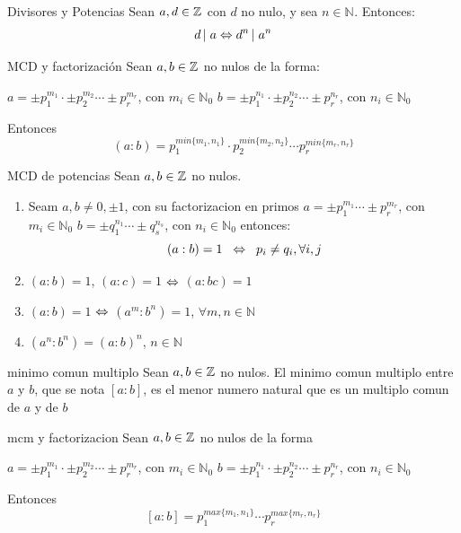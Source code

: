 \documentclass[10pt]{article}
\newcommand{\nat}[1]{\mathbb{N}^{#1}}
\begin{document}
\begin{propo}{Divisores y Potencias}
 Sean $a,d \in \entero{}$ con $d$ no nulo, y sea $n \in \nat{}$. Entonces:
 \[\divi{d}{a} \sii \divi{d^n}{a^n}\]
\end{propo}

\begin{propo}{MCD y factorización}
Sean $a, b \in \entero{}$ no nulos de la forma:
\begin{center}
 $a = \pm p_1^{m_1} \cdot \pm p_2^{m_2} \cdots \pm p_r^{m_r}$, con $m_i \in \nat{}_0$
 $b = \pm p_1^{n_1} \cdot \pm p_2^{n_2} \cdots \pm p_r^{n_r}$, con $n_i \in \nat{}_0$
 \end{center}
  Entonces
  \[(a:b) = p_1^{min\{m_1, n_1\}} \cdot p_2^{min\{m_2, n_2\}} \cdots  p_r^{min\{m_r, n_r\}}\]
\end{propo}

\begin{cor}{MCD de potencias}
Sean $a, b \in \entero{}$ no nulos.
\begin{enumerate}
 \item Seam $a,b \neq 0, \pm 1$, con su factorizacion en primos $a = \pm p_1^{m_1}  \cdots \pm p_r^{m_r}$, con $m_i \in \nat{}_0$
 $b = \pm q_1^{n_1}  \cdots \pm q_s^{n_s}$, con $n_i \in \nat{}_0$ entonces:
 \[(a:b)=1 \es{0.2} \sii \es{0.2} p_i \neq q_i, \forall i, j\]
 \item $(a:b)=1$, $(a:c)=1$ $\sii$ $(a:bc)=1$
 \item $(a:b)=1$ $\sii$ $(a^m:b^n)=1$, $\forall m,n \in \nat{}$
 \item $(a^n: b^n) = (a:b)^n$, $n \in \nat{}$
 \end{enumerate}
\end{cor}

\begin{defi}{minimo comun multiplo}
 Sean $a, b \in \entero{}$ no nulos. El minimo comun multiplo entre $a$ y $b$, que se nota $[a:b]$, es el menor numero natural que es un multiplo comun de $a$ y de $b$
\end{defi}

\begin{propo}{mcm y factorizacion}
 Sean $a,b \in \entero{}$ no nulos de la forma
\begin{center}
 $a = \pm p_1^{m_1} \cdot \pm p_2^{m_2} \cdots \pm p_r^{m_r}$, con $m_i \in \nat{}_0$
 $b = \pm p_1^{n_1} \cdot \pm p_2^{n_2} \cdots \pm p_r^{n_r}$, con $n_i \in \nat{}_0$
 \end{center}
 Entonces
 \[[a:b] = p_1^{max\{m_1,n_1\}} \cdots p_r^{max\{m_r,n_r\} }\]
 \end{propo}
\end{document}
